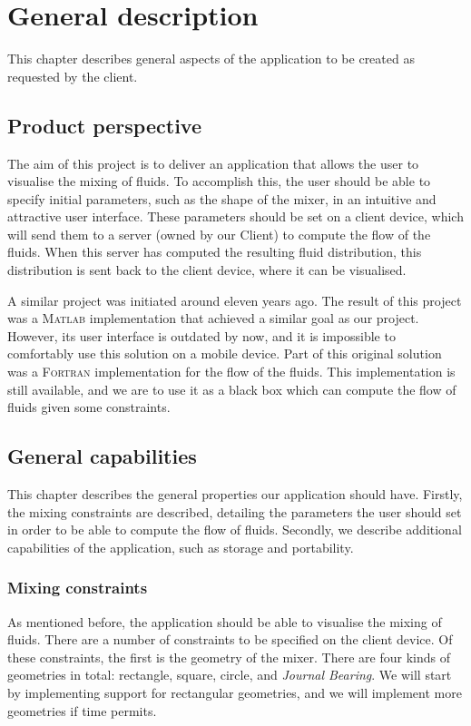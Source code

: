 \chapter{General description}
This chapter describes general aspects of the application to be created as requested by the client.

\section{Product perspective} %
The aim of this project is to deliver an application that allows the user to visualise the mixing of fluids. To accomplish this, the user should be able to specify initial parameters, such as the shape of the mixer, in an intuitive and attractive user interface. These parameters should be set on a client device, which will send them to a server (owned by our Client) to compute the flow of the fluids. When this server has computed the resulting fluid distribution, this distribution is sent back to the client device, where it can be visualised.

A similar project was initiated around eleven years ago. The result of this project was a \textsc{Matlab} implementation that achieved a similar goal as our project. However, its user interface is outdated by now, and it is impossible to comfortably use this solution on a mobile device. Part of this original solution was a \textsc{Fortran} implementation for the flow of the fluids. This implementation is still available, and we are to use it as a black box which can compute the flow of fluids given some constraints.

\section{General capabilities}
This chapter describes the general properties our application should have. Firstly, the mixing constraints are described, detailing the parameters the user should set in order to be able to compute the flow of fluids. Secondly, we describe additional capabilities of the application, such as storage and portability.

\subsection{Mixing constraints}\label{mixingconstraints}
As mentioned before, the application should be able to visualise the mixing of fluids. There are a number of constraints to be specified on the client device. Of these constraints, the first is the geometry of the mixer. There are four kinds of geometries in total: rectangle, square, circle, and \emph{Journal Bearing}. We will start by implementing support for rectangular geometries, and we will implement more geometries if time permits.

